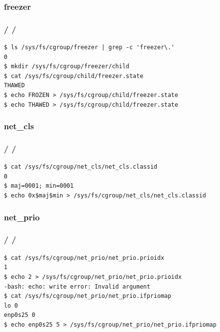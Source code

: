 \documentclass{beamer}
\newcommand{\autotitle}
{\frametitle{
    \secname
    \ifx\insertsubsection\empty
    \else
        /\subsecname
        \ifx\insertsubsubsection\empty\else/\subsubsecname\fi
    \fi}}
\begin{document}
\subsubsection{freezer}

\begin{frame}[fragile]
    \autotitle
    \begin{verbatim}
$ ls /sys/fs/cgroup/freezer | grep -c 'freezer\.'
0
$ mkdir /sys/fs/cgroup/freezer/child
$ cat /sys/fs/cgroup/child/freezer.state
THAWED
$ echo FROZEN > /sys/fs/cgroup/child/freezer.state
$ echo THAWED > /sys/fs/cgroup/child/freezer.state
    \end{verbatim}
\end{frame}

\subsubsection{net\_cls}

\begin{frame}[fragile]
    \autotitle
    \begin{verbatim}
$ cat /sys/fs/cgroup/net_cls/net_cls.classid
0
$ maj=0001; min=0001
$ echo 0x$maj$min > /sys/fs/cgroup/net_cls/net_cls.classid
    \end{verbatim}
\end{frame}

\subsubsection{net\_prio}

\begin{frame}[fragile]
    \autotitle
    \begin{verbatim}
$ cat /sys/fs/cgroup/net_prio/net_prio.prioidx
1
$ echo 2 > /sys/fs/cgroup/net_prio/net_prio.prioidx
-bash: echo: write error: Invalid argument
$ cat /sys/fs/cgroup/net_prio/net_prio.ifpriomap
lo 0
enp0s25 0
$ echo enp0s25 5 > /sys/fs/cgroup/net_prio/net_prio.ifpriomap
    \end{verbatim}
\end{frame}
\end{document}
